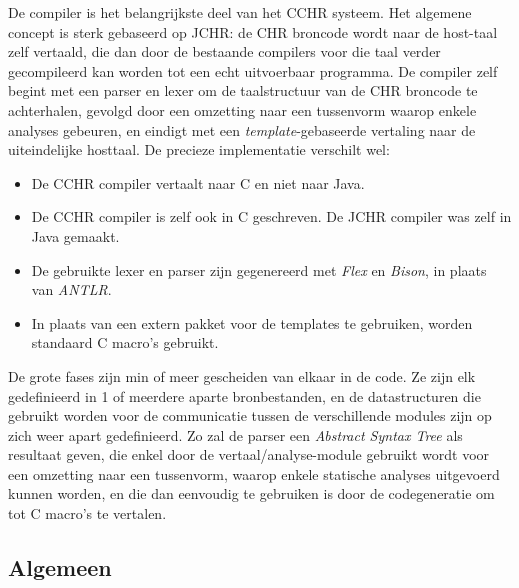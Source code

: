 De compiler is het belangrijkste deel van het CCHR systeem. Het algemene concept is sterk gebaseerd op JCHR: de CHR broncode wordt naar de host-taal zelf vertaald, die dan door de bestaande compilers voor die taal verder gecompileerd kan worden tot een echt uitvoerbaar programma. De compiler zelf begint met een parser en lexer om de taalstructuur van de CHR broncode te achterhalen, gevolgd door een omzetting naar een tussenvorm waarop enkele analyses gebeuren, en eindigt met een {\em template}-gebaseerde vertaling naar de uiteindelijke hosttaal. De precieze implementatie verschilt wel: \begin{itemize}
  \item De CCHR compiler vertaalt naar C en niet naar Java.
  \item De CCHR compiler is zelf ook in C geschreven. De JCHR compiler was zelf in Java gemaakt.
  \item De gebruikte lexer en parser zijn gegenereerd met {\em Flex} en {\em Bison}, in plaats van {\em ANTLR}.
  \item In plaats van een extern pakket voor de templates te gebruiken, worden standaard C macro's gebruikt.
 \end{itemize}
 
De grote fases zijn min of meer gescheiden van elkaar in de code. Ze zijn elk gedefinieerd in 1 of meerdere aparte bronbestanden, en de datastructuren die gebruikt worden voor de communicatie tussen de verschillende modules zijn op zich weer apart gedefinieerd. Zo zal de parser een {\em Abstract Syntax Tree} als resultaat geven, die enkel door de vertaal/analyse-module gebruikt wordt voor een omzetting naar een tussenvorm, waarop enkele statische analyses uitgevoerd kunnen worden, en die dan eenvoudig te gebruiken is door de codegeneratie om tot C macro's te vertalen.

\subsection{Algemeen} \label{sec:comp-werking}


